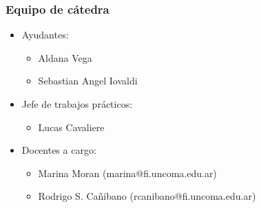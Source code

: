 \documentclass[11pt,a4paper,spanish]{beamer}
\begin{document}
\begin{frame}

    \frametitle{Equipo de cátedra}

\begin{itemize}

\item Ayudantes:
\begin{itemize}
    \item Aldana Vega
    \item Sebastian Angel Iovaldi
\end{itemize}

\item Jefe de trabajos prácticos:
    \begin{itemize}
        \item Lucas Cavaliere
    \end{itemize}

\item Docentes a cargo:
\begin{itemize}
    \item Marina Moran (marina@fi.uncoma.edu.ar)
    \item Rodrigo S. Cañibano (rcanibano@fi.uncoma.edu.ar)
\end{itemize}
\end{itemize}

\end{frame}
\end{document}

